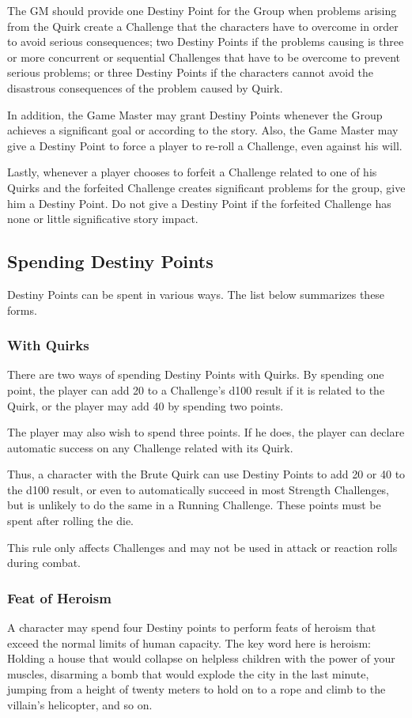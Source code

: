 The GM should provide one Destiny Point
for the Group when problems arising from the
Quirk create a Challenge that the characters have
to overcome in order to avoid serious
consequences; two Destiny Points if the problems
causing is three or more concurrent or sequential
Challenges that have to be overcome to prevent
serious problems; or three Destiny Points if the
characters cannot avoid the disastrous
consequences of the problem caused by Quirk.

In addition, the Game Master may grant
Destiny Points whenever the Group achieves a
significant goal or according to the story. Also, the
Game Master may give a Destiny Point to force a
player to re-roll a Challenge, even against his will.

Lastly, whenever a player chooses to forfeit
a Challenge related to one of his Quirks and the
forfeited Challenge creates significant problems
for the group, give him a Destiny Point. Do not give
a Destiny Point if the forfeited Challenge has none
or little significative story impact.
\subsection{Spending Destiny Points}
Destiny Points can be spent in various
ways. The list below summarizes these forms.

\subsubsection{With Quirks}
There are two ways of spending Destiny
Points with Quirks. By spending one point, the
player can add 20 to a Challenge's d100 result if it
is related to the Quirk, or the player may add 40 by
spending two points.

The player may also wish to spend three
points. If he does, the player can declare automatic
success on any Challenge related with its Quirk.

Thus, a character with the Brute Quirk can
use Destiny Points to add 20 or 40 to the d100
result, or even to automatically succeed in most
Strength Challenges, but is unlikely to do the same
in a Running Challenge. These points must be
spent after rolling the die.

This rule only affects Challenges and may
not be used in attack or reaction rolls during
combat.

\subsubsection{Feat of Heroism}
A character may spend four Destiny points
to perform feats of heroism that exceed the normal
limits of human capacity. The key word here is
heroism: Holding a house that would collapse on
helpless children with the power of your muscles,
disarming a bomb that would explode the city in
the last minute, jumping from a height of twenty
meters to hold on to a rope and climb to the
villain’s helicopter, and so on.

